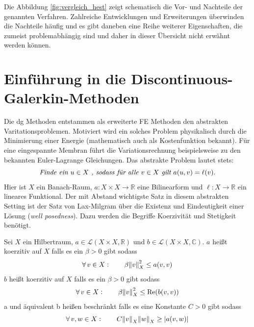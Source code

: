 Die Abbildung \ref{fig:vergleich_hest} zeigt schematisch die Vor- und Nachteile der genannten Verfahren. Zahlreiche Entwicklungen und Erweiterungen überwinden die Nachteile häufig und es gibt daneben eine Reihe weiterer Eigenschaften, die zumeist problemabhängig sind und daher in dieser Übersicht nicht erwähnt werden können.

\section{Einführung in die Discontinuous-Galerkin-Methoden}
Die \ac{dg} Methoden entstammen als erweiterte FE Methoden den abstrakten Varitationsproblemen. Motiviert wird ein solches Problem physikalisch durch die Minimierung einer Energie (mathematisch auch als Kostenfunktion bekannt). Für eine eingespannte Membran führt die Variationsrechnung beispielsweise zu den bekannten Euler-Lagrange Gleichungen. Das abstrakte Problem lautet stets:
\begin{equation}\label{varprob}
      \emph{Finde ein } u\in X\emph{ , sodass für alle } v\in X \emph{ gilt } a(u,v) = \ell(v).
\end{equation}
Hier ist $X$ ein Banach-Raum, $a:X\times X \rightarrow \mathbb{R}$ eine Bilinearform und ${\ell:X\rightarrow \mathbb{R}}$ ein lineares Funktional.
Der mit Abstand wichtigste Satz in diesem abstrakten Setting ist der Satz von Lax-Milgram \cite{buchPietro} über die Existenz und Eindeutigkeit einer Lösung (\emph{well posedness}). Dazu werden die Begriffe Koerzivität und Stetigkeit benötigt.
\begin{definition} \label{def:koerz}
  Sei $X$ ein Hilbertraum, $a \in \mathcal{L}(X\times X, \mathbb{R})$ und $b \in \mathcal{L}(X\times X, \mathbb{C})$. $a$ heißt koerzitiv auf $X$ falls es ein $\beta>0$ gibt sodass
  \begin{equation}
    \forall \, v \in X : \qquad \beta\norm{v}^2_X \leq a(v,v)
  \end{equation}
  $b$ heißt koerzitiv auf $X$ falls es ein $\beta>0$ gibt sodass
  \begin{equation}
    \forall \, v \in X : \qquad \beta\norm{v}^2_X \leq  \operatorname{Re}(b(v,v))   \label{eq:koerz_imag}
  \end{equation}
  a und äquivalent b heißen beschränkt falls es eine Konstante $C>0$ gibt sodass
  \begin{equation}
    \forall \, v,w \in X : \qquad C\norm{v}_X \norm{w}_X \geq |a(v,w)|
  \end{equation}
\end{definition}
